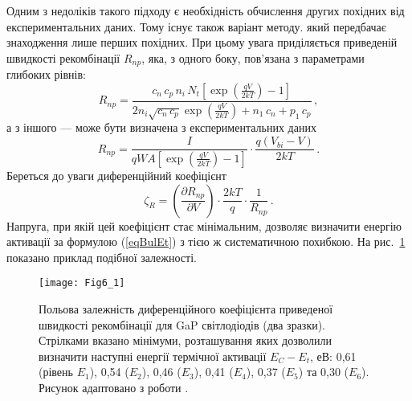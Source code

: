 Одним з недоліків такого підходу є необхідність обчислення других похідних від експериментальних даних.
Тому існує також варіант методу. який передбачає знаходження лише перших похідних.
При цьому увага приділяється приведеній швидкості рекомбінації $R_{np}$,
яка, з одного боку, пов'язана з параметрами глибоких рівнів:
\begin{equation}
  R_{np}=\frac{c_n\,c_p\,n_i\,N_t\left[\exp\left(\frac{qV}{2kT}\right)-1\right]}
   {2n_i\sqrt{c_n\,c_p}\exp\left(\frac{qV}{2kT}\right)+n_1\,c_n+p_1\,c_p}\,,
\end{equation}
а з іншого --- може бути визначена з експериментальних даних
\begin{equation}
  R_{np}=\frac{I}{qWA\left[\exp\left(\frac{qV}{2kT}\right)-1\right]}\cdot\frac{q(V_{bi}-V)}{2kT}\,.
\end{equation}
Береться до уваги диференційний коефіцієнт
\begin{equation}
  \zeta_R=\left(\frac{\partial R_{np}}{\partial V}\right)\cdot\frac{2kT}{q}\cdot\frac{1}{R_{np}}\,.
\end{equation}
Напруга, при якій цей коефіцієнт стає мінімальним, дозволяє визначити
енергію активації за формулою (\ref{eqBulEt}) з тією ж систематичною похибкою.
На рис.~\ref{F61} показано приклад подібної залежності.

\begin{figure}[!b]
\center
\texttt{[image: Fig6\_1]}
\caption{\label{F61}
Польова залежність диференційного коефіцієнта приведеної швидкості рекомбінації
для GaP світлодіодів (два зразки).
Стрілками вказано мінімуми, розташування
яких дозволили визначити наступні енергії 
термічної активації $E_C-E_t$, еВ:
0,61 (рівень $E_1$), 0,54 ($E_2$),
0,46 ($E_3$), 0,41 ($E_4$),
0,37 ($E_5$) та 0,30 ($E_6$).
Рисунок адаптовано з роботи \cite{Bulyar}.
}%
\end{figure}